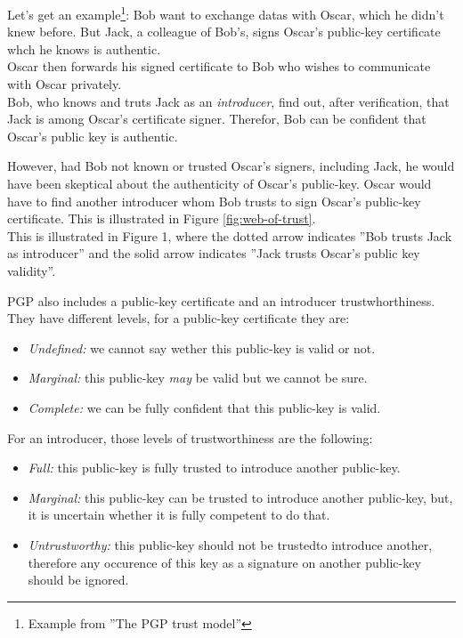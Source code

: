 \documentclass[journal, a4paper]{IEEEtran}
\begin{document}
Let's get an example\footnote{Example from ''The PGP trust model''\cite{caronni2000}}: Bob want to exchange datas with Oscar, which he didn't knew before. But Jack, a colleague of Bob's, signs Oscar's public-key certificate whch he knows is authentic.\\
Oscar then forwards his signed certificate to Bob who wishes to communicate with Oscar privately.\\
Bob, who knows and truts Jack as an \textit{introducer}, find out, after verification, that Jack is among Oscar's certificate signer. Therefor, Bob can be confident that Oscar's public key is authentic.

However, had Bob not known or trusted Oscar's signers, including Jack, he would have been skeptical about the authenticity of Oscar's public-key. Oscar would have to find another introducer whom Bob trusts to sign Oscar's public-key certificate. This is illustrated in Figure \ref{fig:web-of-trust}.\\
This is illustrated in Figure 1, where the dotted arrow indicates ''Bob trusts Jack as introducer'' and the solid arrow indicates ''Jack trusts Oscar’s public key validity''. 


PGP also includes a public-key certificate and an introducer trustwhorthiness. They have different levels, for a public-key certificate they are:
\begin{itemize}
	\item \textit{Undefined:} we cannot say wether this public-key is valid or not.
	\item \textit{Marginal:} this public-key \textit{may} be valid but we cannot be sure.
	\item \textit{Complete:} we can be fully confident that this public-key is valid.
\end{itemize}
For an introducer, those levels of trustworthiness are the following:
\begin{itemize}
	\item \textit{Full:} this public-key is fully trusted to introduce another public-key.
	\item \textit{Marginal:} this public-key can be trusted to introduce another public-key, but, it is uncertain whether it is fully competent to do that.
	\item \textit{Untrustworthy:} this public-key should not be trustedto introduce another, therefore any occurence of this key as a signature on another public-key should be ignored.
\end{itemize}
\end{document}

